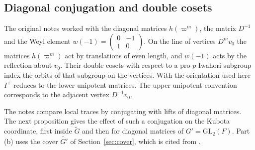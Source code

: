 \documentclass[12pt,letterpaper]{article}
\numberwithin{equation}{section}
\theoremstyle{definition}
\theoremstyle{remark}
\newcommand{\Mp}{\widetilde G}
\newcommand{\sm}[4]{\left(\begin{smallmatrix}#1&#2\\#3&#4\end{smallmatrix}\right)}
\begin{document}
\subsection{Diagonal conjugation and double cosets}
The original notes worked with the diagonal matrices $h(\varpi^m)$, the matrix $D^{-1}$ and the Weyl element $w(-1)=\sm0{-1}10$. On the line of vertices $D^mv_0$ the matrices $h(\varpi^m)$ act by translations of even length, and $w(-1)$ acts by the reflection about $v_0$. Their double cosets with respect to a pro-$p$ Iwahori subgroup index the orbits of that subgroup on the vertices. With the orientation used here $I^+$ reduces to the lower unipotent matrices. The upper unipotent convention corresponds to the adjacent vertex $D^{-1}v_0$.

The notes compare local traces by conjugating with lifts of diagonal matrices. The next proposition gives the effect of such a conjugation on the Kubota coordinate, first inside $\Mp$ and then for diagonal matrices of $G'=\mathrm{GL}_2(F)$. Part (b) uses the cover $\widetilde{G'}$ of Section~\ref{sec:cover}, which is cited from \cite{Ge76}.
\end{document}
